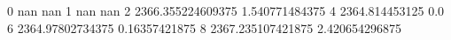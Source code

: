 0 nan nan
1 nan nan
2 2366.355224609375 1.540771484375
4 2364.814453125 0.0
6 2364.97802734375 0.16357421875
8 2367.235107421875 2.420654296875
